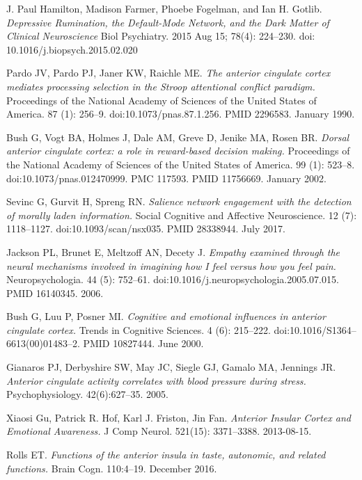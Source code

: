 \documentclass[a4paper, amsfonts, amssymb, amsmath, reprint, showkeys, nofootinbib, twoside]{revtex4-1}
\begin{document}
\begin{thebibliography}{99}
  J. Paul Hamilton, Madison Farmer, Phoebe Fogelman, and Ian H. Gotlib.
  \textit{Depressive Rumination, the Default-Mode Network,
          and the Dark Matter of Clinical Neuroscience}
  Biol Psychiatry. 2015 Aug 15; 78(4): 224–230. doi: 10.1016/j.biopsych.2015.02.020

  Pardo JV, Pardo PJ, Janer KW, Raichle ME.
  \textit{The anterior cingulate cortex mediates processing selection in the Stroop
    attentional conflict paradigm.}
  Proceedings of the National Academy of Sciences of the United States of
  America. 87 (1): 256–9. doi:10.1073/pnas.87.1.256. PMID 2296583. January 1990.

  Bush G, Vogt BA, Holmes J, Dale AM, Greve D, Jenike MA, Rosen BR.
  \textit{Dorsal anterior cingulate cortex: a role in reward-based decision making.}
  Proceedings of the National Academy of Sciences of the United States of
  America. 99 (1): 523–8. doi:10.1073/pnas.012470999. PMC 117593. PMID
  11756669. January 2002.

  Sevinc G, Gurvit H, Spreng RN.
  \textit{Salience network engagement with the detection of morally laden
    information.}
  Social Cognitive and Affective Neuroscience. 12 (7):
  1118–1127. doi:10.1093/scan/nsx035. PMID 28338944. July 2017.

  Jackson PL, Brunet E, Meltzoff AN, Decety J.
  \textit{Empathy examined through the neural mechanisms involved in imagining how I
    feel versus how you feel pain.}
  Neuropsychologia. 44 (5): 752–61. doi:10.1016/j.neuropsychologia.2005.07.015. PMID
  16140345. 2006.

  Bush G, Luu P, Posner MI.
  \textit{Cognitive and emotional influences in anterior cingulate cortex.}
  Trends in Cognitive Sciences. 4 (6):
  215–222. doi:10.1016/S1364–6613(00)01483–2. PMID 10827444. June 2000.

  Gianaros PJ, Derbyshire SW, May JC, Siegle GJ, Gamalo MA, Jennings JR.
  \textit{Anterior cingulate activity correlates with blood pressure during
    stress.}
  Psychophysiology. 42(6):627–35. 2005.

  Xiaosi Gu, Patrick R. Hof, Karl J. Friston, Jin Fan.
  \textit{Anterior Insular Cortex and Emotional Awareness.}
  J Comp Neurol. 521(15): 3371–3388. 2013-08-15.

  Rolls ET.
  \textit{Functions of the anterior insula in taste, autonomic, and related
    functions.}
  Brain Cogn. 110:4–19. December 2016.


\end{thebibliography}
\end{document}
